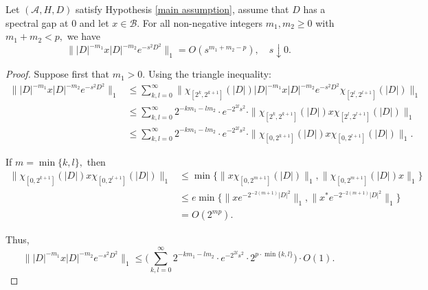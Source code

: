     \begin{lem}\label{first decay lemma} 
        Let $(\mathcal{A},H,D)$ satisfy Hypothesis \ref{main assumption}, assume that $D$ has a spectral gap at $0$ and let $x\in\mathcal{B}$. For all non-negative integers $m_1,m_2 \geq 0$ with $m_1+m_2<p,$ we have
        \begin{equation*}
            \||D|^{-m_1}x|D|^{-m_2}e^{-s^2D^2}\|_1 = O(s^{m_1+m_2-p}),\quad s\downarrow0.
        \end{equation*}
    \end{lem}
    \begin{proof} 
        Suppose first that $m_1>0.$ Using the triangle inequality:
        \begin{align*}
            \||D|^{-m_1}x|D|^{-m_2}e^{-s^2D^2}\|_1 &\leq \sum_{k,l=0}^{\infty}\|\chi_{[2^k,2^{k+1}]}(|D|)|D|^{-m_1}x|D|^{-m_2}e^{-s^2D^2}\chi_{[2^l,2^{l+1}]}(|D|)\|_1\\
                                                   &\leq \sum_{k,l=0}^{\infty}2^{-km_1-lm_2}\cdot e^{-2^{2l}s^2}\cdot\|\chi_{[2^k,2^{k+1}]}(|D|)x\chi_{[2^l,2^{l+1}]}(|D|)\|_1\\
                                                   &\leq \sum_{k,l=0}^{\infty}2^{-km_1-lm_2}\cdot e^{-2^{2l}s^2}\cdot\|\chi_{[0,2^{k+1}]}(|D|)x\chi_{[0,2^{l+1}]}(|D|)\|_1.
        \end{align*}

        If $m=\min\{k,l\},$ then
        \begin{align*}
            \|\chi_{[0,2^{k+1}]}(|D|)x\chi_{[0,2^{l+1}]}(|D|)\Big\|_1 &\leq \min\Big\{\Big\|x\chi_{[0,2^{m+1}]}(|D|)\Big\|_1,\Big\|\chi_{[0,2^{m+1}]}(|D|)x\Big\|_1\Big\}\\
                                                                      &\leq e\min\Big\{\Big\|xe^{-2^{-2(m+1)}|D|^2}\Big\|_1,\Big\|x^*e^{-2^{-2(m+1)}|D|^2}\Big\|_1\Big\}\\
                                                                      &= O(2^{mp}).
        \end{align*}

        Thus,
        \begin{equation*}
            \||D|^{-m_1}x|D|^{-m_2}e^{-s^2D^2}\|_1 \leq \Big(\sum_{k,l=0}^{\infty}2^{-km_1-lm_2}\cdot e^{-2^{2l}s^2}\cdot 2^{p\cdot\min\{k,l\}}\Big)\cdot O(1).
        \end{equation*}


\end{proof}
